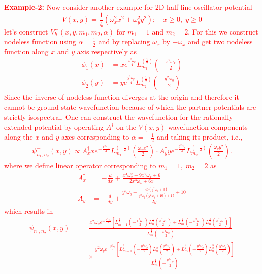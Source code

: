 \documentclass[12pt]{article}
\numberwithin{equation}{section} %
\begin{document}
\textcolor{red}{
{\bf Example-2:} Now consider another example for 2D half-line oscillator potential
\[V(x,y)=\frac{1}{4}\left(\omega_x^2 x^2+\omega_y^2y^2\right);\quad x\ge0,\;y\ge0\]
let's construct $V_h^-(x,y,m_1,m_2,\alpha)$ for $m_1=1$ and $m_2=2$. For this we construct nodeless function using $\alpha=\frac{1}{2}$ and by replacing $\omega_x$ by $-\omega_x$ and get two nodeless function along $x$ and $y$ axis respectively as
\begin{align*}
  \phi_1(x)&= x e^{\frac{x^2\omega_x}{4}} L_{m_1}^{(\frac{1}{2})}\left(-\frac{x^2 \omega_x}{2}\right)\\
  \phi_2(y)&= y e^{\frac{y^2\omega_y}{4}} L_{m_2}^{(\frac{1}{2})}\left(-\frac{y^2 \omega_y}{2}\right)
\end{align*}
Since the inverse of nodeless function diverges at the origin and therefore it cannot be ground state wavefunction because of which the partner potentials are strictly isospectral.
One can construct the wavefunction for the rationally extended potential by operating \( A^\dagger \) on the \( V(x,y) \) wavefunction components along the \( x \) and \( y \) axes corresponding to \( \alpha = -\frac{1}{2} \) and taking its product, i.e.,  
\begin{align*}
  \psi_{n_1,n_2}^-(x,y) \propto A_x^\dagger x e^{-\frac{x^2 \omega_x }{4}} L_{m_1}^{(-\frac{1}{2})} \left(\frac{\omega_x x^2}{2}\right)\cdot A_y^\dagger y e^{-\frac{y^2 \omega_y }{4}} L_{m_2}^{(-\frac{1}{2})} \left(\frac{\omega_y y^2}{2}\right).
\end{align*}
where we define linear operator corresponding to $m_1=1,\;m_2=2$ as
\begin{align*}
  A_x^\dagger&=-\frac{d}{dx}+\frac{x^4 \omega_x^2+9 x^2 \omega_x+6}{2 x^3 \omega_x+6 x}\\
  A_y^\dagger&=-\frac{d}{dy}+\frac{y^2 \omega_y -\frac{40 \left(y^2 \omega_y +3\right)}{y^2 \omega_y \left(y^2 \omega_y +10\right)+15}+10}{2 y}
\end{align*}
which results in
\begin{align*}
  \psi_{n_1,n_2}(x,y)^-&= \frac{x^2 \omega_x e^{-\frac{x^2 \omega_x}{4}} \left[L_{m-1}^{\frac{3}{2}}\left(-\frac{x^2 \omega_x}{2} \right) L_n^{\frac{1}{2}}\left(\frac{x^2 \omega_x}{2}\right)+L_m^{\frac{1}{2}}\left(-\frac{x^2 \omega_x}{2} \right) L_n^{\frac{3}{2}}\left(\frac{x^2 \omega_x}{2}\right)\right]}{L_m^{\frac{1}{2}}\left(-\frac{x^2 \omega_x}{2} \right)}\\
  &\quad\times \frac{y^2 \omega_y e^{-\frac{y^2 \omega_y}{4}} \left[L_{m-1}^{\frac{3}{2}}\left(-\frac{y^2 \omega_y}{2} \right) L_n^{\frac{1}{2}}\left(\frac{y^2 \omega_y}{2}\right)+L_m^{\frac{1}{2}}\left(-\frac{y^2 \omega_y}{2}\right) L_n^{\frac{3}{2}}\left(\frac{y^2 \omega_y}{2}\right)\right]}{L_m^{\frac{1}{2}}\left(-\frac{y^2 \omega_y}{2} \right)}

\end{align*}}
\end{document}
